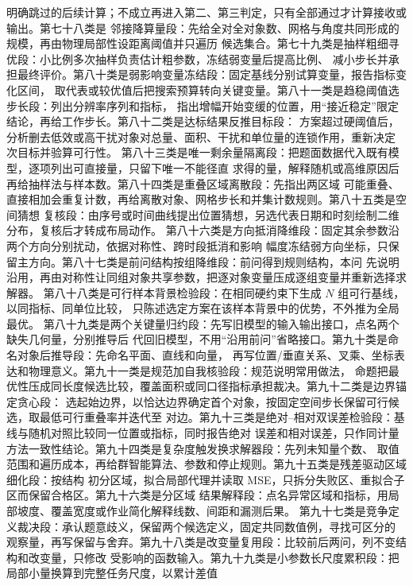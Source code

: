 明确跳过的后续计算；不成立再进入第二、第三判定，只有全部通过才计算接收或输出。第七十八类是
邻接降算量段：先给全对全对象数、网格与角度共同形成的规模，再由物理局部性设距离阈值并只遍历
候选集合。第七十九类是抽样粗细寻优段：小比例多次抽样负责估计粗参数，冻结弱变量后提高比例、
减小步长并承担最终评价。第八十类是弱影响变量冻结段：固定基线分别试算变量，报告指标变化区间，
取代表或较优值后把搜索预算转向关键变量。第八十一类是趋稳阈值选步长段：列出分辨率序列和指标，
指出增幅开始变缓的位置，用“接近稳定”限定结论，再给工作步长。第八十二类是达标结果反推目标段：
方案超过硬阈值后，分析删去低效或高干扰对象对总量、面积、干扰和单位量的连锁作用，重新决定
次目标并验算可行性。
第八十三类是唯一剩余量隔离段：把题面数据代入既有模型，逐项列出可直接量，只留下唯一不能径直
求得的量，解释随机或高维原因后再给抽样法与样本数。第八十四类是重叠区域离散段：先指出两区域
可能重叠、直接相加会重复计数，再给离散对象、网格步长和并集计数规则。第八十五类是空间猜想
复核段：由序号或时间曲线提出位置猜想，另选代表日期和时刻绘制二维分布，复核后才转成布局动作。
第八十六类是方向抵消降维段：固定其余参数沿两个方向分别扰动，依据对称性、跨时段抵消和影响
幅度冻结弱方向坐标，只保留主方向。第八十七类是前问结构按组降维段：前问得到规则结构，本问
先说明沿用，再由对称性让同组对象共享参数，把逐对象变量压成逐组变量并重新选择求解器。
第八十八类是可行样本背景检验段：在相同硬约束下生成 $N$ 组可行基线，以同指标、同单位比较，
只陈述选定方案在该样本背景中的优势，不外推为全局最优。
第八十九类是两个关键量归约段：先写旧模型的输入输出接口，点名两个缺失几何量，分别推导后
代回旧模型，不用“沿用前问”省略接口。第九十类是命名对象后推导段：先命名平面、直线和向量，
再写位置/垂直关系、叉乘、坐标表达和物理意义。第九十一类是规范加自我核验段：规范说明常用做法，
命题把最优性压成同长度候选比较，覆盖面积或同口径指标承担裁决。第九十二类是边界锚定贪心段：
选起始边界，以恰达边界确定首个对象，按固定空间步长保留可行候选，取最低可行重叠率并迭代至
对边。第九十三类是绝对--相对双误差检验段：基线与随机对照比较同一位置或指标，同时报告绝对
误差和相对误差，只作同计量方法一致性结论。第九十四类是复杂度触发换求解器段：先列未知量个数、
取值范围和遍历成本，再给群智能算法、参数和停止规则。第九十五类是残差驱动区域细化段：按结构
初分区域，拟合局部代理并读取 MSE，只拆分失败区、重拟合子区而保留合格区。第九十六类是分区域
结果解释段：点名异常区域和指标，用局部坡度、覆盖宽度或作业简化解释线数、间距和漏测后果。
第九十七类是竞争定义裁决段：承认题意歧义，保留两个候选定义，固定共同数值例，寻找可区分的
观察量，再写保留与舍弃。第九十八类是改变量复用段：比较前后两问，列不变结构和改变量，只修改
受影响的函数输入。第九十九类是小参数长尺度累积段：把局部小量换算到完整任务尺度，以累计差值
